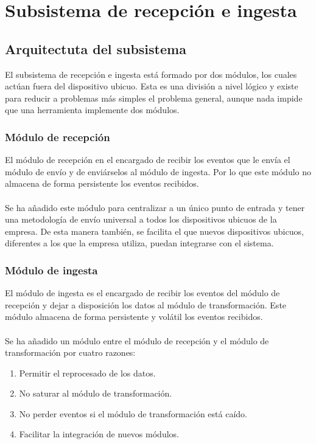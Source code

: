 \chapter{Subsistema de recepción e ingesta}

\section{Arquitectuta del subsistema}

El subsistema de recepción e ingesta está formado por dos módulos, los cuales actúan fuera del dispositivo ubicuo. Esta es una división a nivel lógico y existe para reducir a problemas más simples el problema general, aunque nada impide que una herramienta implemente dos módulos.

\subsection{Módulo de recepción}

El módulo de recepción en el encargado de recibir los eventos que le envía el módulo de envío y de enviárselos al módulo de ingesta. Por lo que este módulo no almacena de forma persistente los eventos recibidos.
\\\\
Se ha añadido este módulo para centralizar a un único punto de entrada y tener una metodología de envío universal a todos los dispositivos ubicuos de la empresa. De esta manera también, se facilita el que nuevos dispositivos ubicuos, diferentes a los que la empresa utiliza, puedan integrarse con el sistema.

\subsection{Módulo de ingesta} 

El módulo de ingesta es el encargado de recibir los eventos del módulo de recepción y dejar a disposición los datos al módulo de transformación. Este módulo almacena de forma persistente y volátil los eventos recibidos.
\\\\
Se ha añadido un módulo entre el módulo de recepción y el módulo de transformación por cuatro razones:

\begin{enumerate}
	\item Permitir el reprocesado de los datos.
	\item No saturar al módulo de transformación.
	\item No perder eventos si el módulo de transformación está caído.
	\item Facilitar la integración de nuevos módulos.
\end{enumerate}

